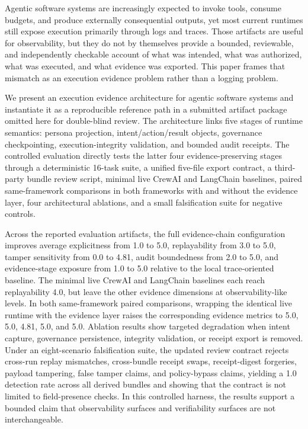 Agentic software systems are increasingly expected to invoke tools, consume budgets, and produce externally consequential outputs, yet most current runtimes still expose execution primarily through logs and traces. Those artifacts are useful for observability, but they do not by themselves provide a bounded, reviewable, and independently checkable account of what was intended, what was authorized, what was executed, and what evidence was exported. This paper frames that mismatch as an execution evidence problem rather than a logging problem.

We present an execution evidence architecture for agentic software systems and instantiate it as a reproducible reference path in a submitted artifact package omitted here for double-blind review. The architecture links five stages of runtime semantics: persona projection, intent/action/result objects, governance checkpointing, execution-integrity validation, and bounded audit receipts. The controlled evaluation directly tests the latter four evidence-preserving stages through a deterministic 16-task suite, a unified five-file export contract, a third-party bundle review script, minimal live CrewAI and LangChain baselines, paired same-framework comparisons in both frameworks with and without the evidence layer, four architectural ablations, and a small falsification suite for negative controls.

Across the reported evaluation artifacts, the full evidence-chain configuration improves average explicitness from 1.0 to 5.0, replayability from 3.0 to 5.0, tamper sensitivity from 0.0 to 4.81, audit boundedness from 2.0 to 5.0, and evidence-stage exposure from 1.0 to 5.0 relative to the local trace-oriented baseline. The minimal live CrewAI and LangChain baselines each reach replayability 4.0, but leave the other evidence dimensions at observability-like levels. In both same-framework paired comparisons, wrapping the identical live runtime with the evidence layer raises the corresponding evidence metrics to 5.0, 5.0, 4.81, 5.0, and 5.0. Ablation results show targeted degradation when intent capture, governance persistence, integrity validation, or receipt export is removed. Under an eight-scenario falsification suite, the updated review contract rejects cross-run replay mismatches, cross-bundle receipt swaps, receipt-digest forgeries, payload tampering, false tamper claims, and policy-bypass claims, yielding a 1.0 detection rate across all derived bundles and showing that the contract is not limited to field-presence checks. In this controlled harness, the results support a bounded claim that observability surfaces and verifiability surfaces are not interchangeable.

